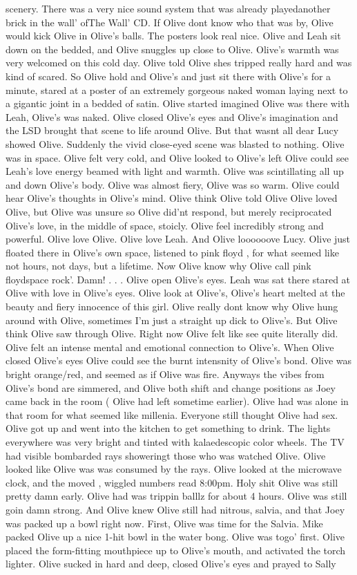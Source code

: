 \documentclass[12pt]{book}
\begin{document}
scenery. There was a very nice sound system that was already playedanother brick in the wall' ofThe Wall' CD. If Olive dont know who that was by, Olive would kick Olive in Olive's balls. The posters look real nice. Olive and Leah sit down on the bedded, and Olive snuggles up close to Olive. Olive's warmth was very welcomed on this cold day. Olive told Olive shes tripped really hard and was kind of scared. So Olive hold and Olive's and just sit there with Olive's for a minute, stared at a poster of an extremely gorgeous naked woman laying next to a gigantic joint in a bedded of satin. Olive started imagined Olive was there with Leah, Olive's was naked. Olive closed Olive's eyes and Olive's imagination and the LSD brought that scene to life around Olive. But that wasnt all dear Lucy showed Olive. Suddenly the vivid close-eyed scene was blasted to nothing. Olive was in space. Olive felt very cold, and Olive looked to Olive's left Olive could see Leah's love energy beamed with light and warmth. Olive was scintillating all up and down Olive's body. Olive was almost fiery, Olive was so warm. Olive could hear Olive's thoughts in Olive's mind. Olive think Olive told Olive Olive loved Olive, but Olive was unsure so Olive did'nt respond, but merely reciprocated Olive's love, in the middle of space, stoicly. Olive feel incredibly strong and powerful. Olive love Olive. Olive love Leah. And Olive loooooove Lucy. Olive just floated there in Olive's own space, listened to pink floyd , for what seemed like not hours, not days, but a lifetime. Now Olive know why Olive call pink floydspace rock'. Damn!  . . .  Olive open Olive's eyes. Leah was sat there stared at Olive with love in Olive's eyes. Olive look at Olive's, Olive's heart melted at the beauty and fiery innocence of this girl. Olive really dont know why Olive hung around with Olive, sometimes I'm just a straight up dick to Olive's. But Olive think Olive saw through Olive. Right now Olive felt like see quite literally did. Olive felt an intense mental and emotional connection to Olive's. When Olive closed Olive's eyes Olive could see the burnt intensnity of Olive's bond. Olive was bright orange/red, and seemed as if Olive was fire. Anyways the vibes from Olive's bond are simmered, and Olive both shift and change positions as Joey came back in the room ( Olive had left sometime earlier). Olive had was alone in that room for what seemed like millenia. Everyone still thought Olive had sex. Olive got up and went into the kitchen to get something to drink. The lights everywhere was very bright and tinted with kalaedescopic color wheels. The TV had visible bombarded rays showeringt those who was watched Olive. Olive looked like Olive was was consumed by the rays. Olive looked at the microwave clock, and the moved , wiggled numbers read 8:00pm. Holy shit Olive was still pretty damn early. Olive had was trippin balllz for about 4 hours. Olive was still goin damn strong. And Olive knew Olive still had nitrous, salvia, and that Joey was packed up a bowl right now. First, Olive was time for the Salvia. Mike packed Olive up a nice 1-hit bowl in the water bong. Olive was togo' first. Olive placed the form-fitting mouthpiece up to Olive's mouth, and activated the torch lighter. Olive sucked in hard and deep, closed Olive's eyes and prayed to Sally 
\end{document}
